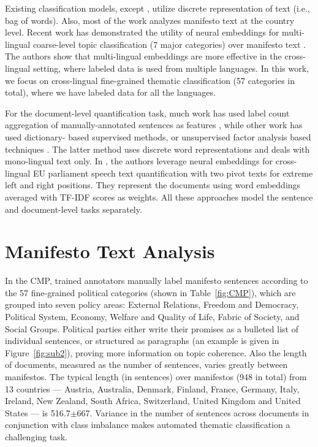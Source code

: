 \documentclass[11pt,a4paper]{article}
\newcommand{\tabref}[2][]{Table#1~\ref{#2}\xspace}
\newcommand{\figref}[2][]{Figure#1~\ref{#2}\xspace}
\begin{document}
Existing classification models, except \cite{W17-2906}, utilize discrete representation of text (i.e., bag of words).  Also, most of the work analyzes manifesto text at the country level. Recent work has demonstrated the utility of neural embeddings for multi-lingual coarse-level topic classification (7 major categories) over manifesto text \cite{W17-2906}. The authors show that multi-lingual embeddings are more effective in the cross-lingual setting, where labeled data is used from multiple languages. In this work, we focus on cross-lingual fine-grained thematic classification (57 categories in total), where we have labeled data for all the languages.

For the document-level quantification task, much work has used label count aggregation of  manually-annotated sentences as features \cite{lowe2011scaling, benoit2014putting}, while other work has used dictionary- based supervised methods, or unsupervised factor analysis based techniques \cite{hjorth2015computers, 2017arXiv170704737B}. The latter method uses discrete word representations and deals with mono-lingual text only. In , the authors leverage neural embeddings for cross-lingual EU parliament speech text quantification with two pivot texts for extreme left and right positions. They represent the documents using word embeddings averaged with TF-IDF scores as weights. All these approaches model the sentence and document-level tasks separately.


\section{Manifesto Text Analysis}

In the CMP, trained annotators manually label manifesto sentences according to the 57 fine-grained political categories (shown in \tabref{fig:CMP}), which are grouped into seven policy areas: External Relations, Freedom and Democracy, Political System, Economy, Welfare and Quality of Life, Fabric of Society, and Social Groups. Political parties either write their promises as a bulleted list of individual sentences, or structured as paragraphs (an example is given in \figref{fig:sub2}), proving more information on topic coherence. Also the length of documents, measured as the number of sentences, varies greatly between manifestos. The typical length (in sentences) over manifestos (948 in total) from 13 countries --- Austria, Australia, Denmark, Finland, France, Germany, Italy, Ireland, New Zealand, South Africa, Switzerland, United Kingdom and United States --- is 516.7$\pm$667. Variance in the number of sentences across documents in conjunction with class imbalance makes automated thematic classification a challenging task.  
\end{document}
